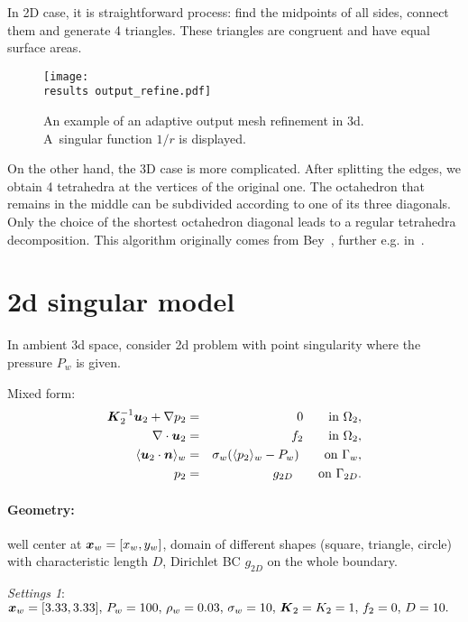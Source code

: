 In 2D case, it is straightforward process: find the midpoints of all sides, connect them and generate 4 triangles.
These triangles are congruent and have equal surface areas.
%
\begin{figure}[!htb]
    \centering    
    \texttt{[image: \\results output\_refine.pdf]} 
    \caption[output mesh refinement]
  {An example of an adaptive output mesh refinement in 3d.
  A~singular function $1/r$ is displayed.}
  \label{fig:output_refinement_flow123d}
\end{figure}
%
On the other hand, the 3D case is more complicated. After splitting the edges, we obtain 4 tetrahedra at the vertices
of the original one. The octahedron that remains in the middle can be subdivided according to one of its three diagonals.
Only the choice of the shortest octahedron diagonal leads to a regular tetrahedra decomposition.
This algorithm originally comes from Bey~\cite{bey_2000}, further e.g. in~\cite{brandts_2011}.





\section{2d singular model}

In ambient 3d space, consider 2d problem with point singularity where the pressure $P_w$ is given.
  
  Mixed form:
  \begin{eqnarray}
\mathbf{\boldsymbol{K}}_2^{-1}\mathbf{\boldsymbol{u}}_2 + \nabla p_2 &=& 0 \qquad \textrm{in } \Omega_2, \label{eqn:2d_darcy_law}\\
\nabla \cdot \mathbf{\boldsymbol{u}}_2 &=& f_2 \qquad \textrm{in } \Omega_2, \label{eqn:2d_continuity}\\
\langle\mathbf{\boldsymbol{u}}_2 \cdot \mathbf{\boldsymbol{n}}\rangle_w &=& \sigma_w (\langle p_2\rangle_w - P_w) \qquad \textrm{on } \Gamma_w,\label{eqn:2d_well_cond}\\
p_2 &=& g_{2D} \qquad \textrm{on } \Gamma_{2D}.
  \end{eqnarray}
  
  \paragraph{Geometry:} well center at $\mathbf{\boldsymbol{x}}_w=[x_w,y_w]$, domain of different shapes (square, triangle, circle) with characteristic length $D$, Dirichlet BC $g_{2D}$ on the whole boundary.
  
  \emph{Settings 1}: $\mathbf{\boldsymbol{x}}_w=[3.33,3.33],\, P_w = 100,\, \rho_w=0.03,\, \sigma_w=10,\, \mathbf{\boldsymbol{K}}_2=K_2=1,\, f_2=0,\, D=10.$
  
